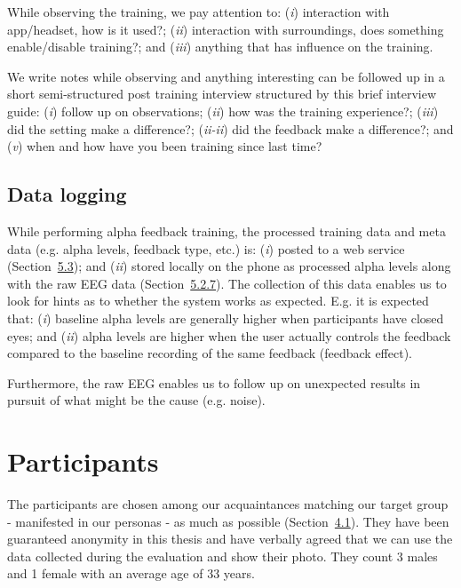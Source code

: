 \documentclass[a4paper,10pt,english,lof,lot,twoside]{puthesis}
\begin{document}
While observing the training, we pay attention to: (\emph{i}) interaction with app/headset, how is it used?; (\emph{ii}) interaction with surroundings, does something enable/disable training?; and (\emph{iii}) anything that has influence on the training.

We write notes while observing and anything interesting can be followed up in a short semi-structured post training interview structured by this brief interview guide: (\emph{i}) follow up on observations; (\emph{ii}) how was the training experience?; (\emph{iii}) did the setting make a difference?; (\emph{ii-ii}) did the feedback make a difference?; and (\emph{v}) when and how have you been training since last time?


\subsection{Data logging}
\label{ch-evaluation/index:data-logging}
While performing alpha feedback training, the processed training data and meta data (e.g. alpha levels, feedback type, etc.) is: (\emph{i}) posted to a web service (Section {\hyperref[ch-implementation/index:ch-implementation-alphatrainer-cloud-based-storage]{5.3}}); and (\emph{ii}) stored locally on the phone as processed alpha levels along with the raw EEG data (Section {\hyperref[ch-implementation/index:ch-implementation-models-persistent-storage]{5.2.7}}). The collection of this data enables us to look for hints as to whether the system works as expected. E.g. it is expected that: (\emph{i}) baseline alpha levels are generally higher when participants have closed eyes; and (\emph{ii}) alpha levels are higher when the user actually controls the feedback compared to the baseline recording of the same feedback (feedback effect).

Furthermore, the raw EEG enables us to follow up on unexpected results in pursuit of what might be the cause (e.g. noise).


\section{Participants}
\label{ch-evaluation/index:participants}
The participants are chosen among our acquaintances matching our target group - manifested in our personas - as much as possible (Section {\hyperref[ch-design/index:ch-design-model-and-method]{4.1}}). They have been guaranteed anonymity in this thesis and have verbally agreed that we can use the data collected during the evaluation and show their photo. They count 3 males and 1 female with an average age of 33 years.
\end{document}
